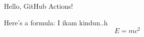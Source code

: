 \documentclass{article}
\begin{document}
Hello, GitHub Actions!

Here's a formula:
I ikam kindun..h
\[
E = mc^2
\]
\end{document}

